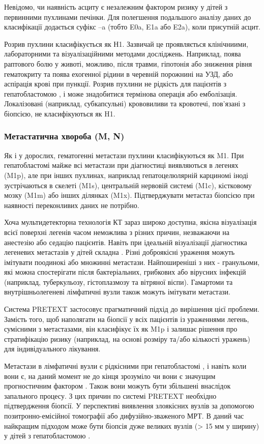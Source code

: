 Невідомо, чи наявність асциту є незалежним фактором ризику у дітей з первинними пухлинами печінки. Для полегшення подальшого аналізу даних до класифікації додається суфікс –a (тобто E0a, E1a або E2a), коли присутній асцит.

Розрив пухлини класифікується як Н1. Зазвичай це проявляється  клінічниими, лабораторними та візуалізаційними методами досліджень. Наприклад, поява раптового болю у животі, можливо, після травми, гіпотонія або зниження рівня гематокриту та поява ехогенної рідини в черевній порожнині на УЗД, або аспірація крові при пункції. Розрив пухлини не рідкість для пацієнтів з гепатобластомою \cite{pmid24132546}, і може знадобитися термінова операція або емболізація. Локалізовані (наприклад, субкапсульні) крововиливи та кровотечі, пов’язані з біопсією, не класифікуються як H1.
\subsubsection{Метастатична хвороба (M, N)}
Як і у дорослих, гематогенні метастази пухлини класифікуються як M1. При гепатобластомі майже всі метастази при діагностиці виявляються в легенях (M1p), але при інших пухлинах, наприклад гепатоцелюлярній карциномі іноді зустрічаються в скелеті (M1s), центральній нервовій системі (M1c), кістковому мозку (M1m) або інших ділянках (M1x). Підтверджувати метастаз біопсією при наявності переконливих даних не потрібно.  

Хоча мультидетекторна технологія КТ зараз широко доступна, якісна візуалізація всієї поверхні легенів часом неможлива з різних причин, незважаючи на анестезію або седацію пацієнтів. Навіть при ідеальній візуалізації діагностика легеневих метастазів у дітей складна \cite{pmid24362406}. Різні доброякісні ураження можуть імітувати поодинокі або множинні метастази. Найпоширеніші з них - гранульоми, які можна спостерігати після бактеріальних, грибкових або вірусних інфекцій (наприклад, туберкульозу, гістоплазмозу та вітряної віспи). Гамартоми та внутрішньолегеневі лімфатичні вузли також можуть імітувати метастази.

Система PRETEXT застосовує прагматичний підхід до вирішення цієї проблеми. Замість того, щоб наполягати на біопсії у всіх пацієнтів із ураженнями легень, сумісними з метастазами, він класифікує їх як M1p і залишає рішення про стратифікацію ризику (наприклад, на основі розміру та/або кількості уражень) для індивідуального лікування. 

Метастази в лімфатичні вузли є рідкісними при гепатобластомі \cite{pmid24734315}, і навіть коли вони є, на даний момент не до кінця зрозуміло чи вони є значущим прогностичним фактором \cite{pmid24757164}. Також вони можуть бути збільшені внаслідок запального процесу. З цих причин по системі PRETEXT необхідно підтвердження біопсії. У перспективі виявлення злоякісних вузлів за допомогою позитронно-емісійної томографії або дифузійно-зваженого МРТ. В даний час найкращим підходом може бути біопсія дуже великих вузлів (> 15 мм у ширину) у дітей з гепатобластомою \cite{pmid24759227}. 

